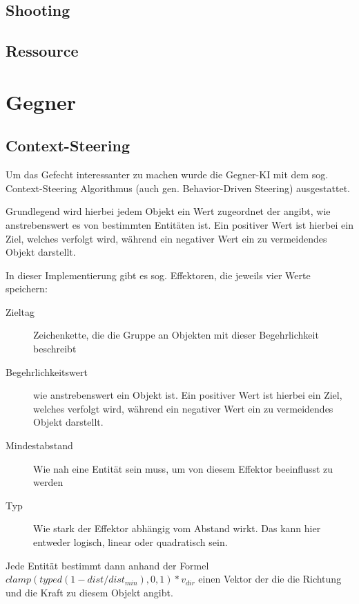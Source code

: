 \documentclass[a4paper,10pt,ngerman,fontsize=12pt]{scrreprt}
\begin{document}
\subsection{Shooting}

\lipsum[3]


\subsection{Ressource}

\lipsum[3]




\section{Gegner}

\lipsum[3]



\subsection{Context-Steering}

Um das Gefecht interessanter zu machen wurde die Gegner-KI mit dem sog. Context-Steering Algorithmus\cite{qCtxSteer} (auch gen. Behavior-Driven Steering) ausgestattet.

Grundlegend wird hierbei jedem Objekt ein Wert zugeordnet der angibt, wie anstrebenswert es von bestimmten Entitäten ist. Ein positiver Wert ist hierbei ein Ziel, welches verfolgt wird, während ein negativer Wert ein zu vermeidendes Objekt darstellt.

In dieser Implementierung gibt es sog. Effektoren, die jeweils vier Werte speichern:

\begin{description}
\item[Zieltag] Zeichenkette, die die Gruppe an Objekten mit dieser Begehrlichkeit beschreibt
\item[Begehrlichkeitswert] wie anstrebenswert ein Objekt ist. Ein positiver Wert ist hierbei ein Ziel, welches verfolgt wird, während ein negativer Wert ein zu vermeidendes Objekt darstellt.
\item[Mindestabstand] Wie nah eine Entität sein muss, um von diesem Effektor beeinflusst zu werden
\item[Typ] Wie stark der Effektor abhängig vom Abstand wirkt. Das kann hier entweder logisch, linear oder quadratisch sein. 
\end{description}

Jede Entität bestimmt dann anhand der Formel $ clamp(typed(1 - dist / dist_{min}), 0, 1) * v_{dir} $ einen Vektor der die die Richtung und die Kraft zu diesem Objekt angibt.
\end{document}
